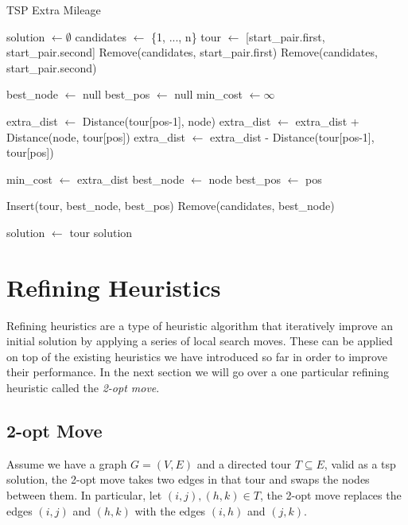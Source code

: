 \documentclass{article}
\begin{document}
\newpage

\begin{algorithm}[!ht]
\caption{TSP Extra Mileage}
\begin{algorithmic}[1]
\State solution $\gets \emptyset$
\State candidates $\gets$ \{1, ..., n\} 
\State tour $\gets$ [start\_pair.first, start\_pair.second] 
\State Remove(candidates, start\_pair.first)
\State Remove(candidates, start\_pair.second)

    \State best\_node $\gets$ null
    \State best\_pos $\gets$ null
    \State min\_cost $\gets \infty$

            \State extra\_dist $\gets$ Distance(tour[pos-1], node)
            \State extra\_dist $\gets$ extra\_dist + Distance(node, tour[pos])
            \State extra\_dist $\gets$ extra\_dist - Distance(tour[pos-1], tour[pos])
            
                \State min\_cost $\gets$ extra\_dist
                \State best\_node $\gets$ node
                \State best\_pos $\gets$ pos
            \EndIf
        \EndFor
    \EndFor

    \State Insert(tour, best\_node, best\_pos)
    \State Remove(candidates, best\_node)
\EndWhile

\State solution $\gets$ tour
\State \Return solution
\EndProcedure
\end{algorithmic}
\end{algorithm}

\newpage

\section{Refining Heuristics}
Refining heuristics are a type of heuristic algorithm that iteratively improve an initial solution by applying a series of local search moves. These can be applied on top of the existing heuristics we have 
introduced so far in order to improve their performance. In the next section we will go over a one particular refining heuristic called the \textit{2-opt move}\cite{Heuristics_for_the_Traveling_Salesman_Problem}.

\subsection{2-opt Move}
Assume we have a graph $G = (V, E)$ and a directed tour $T \subseteq E$, valid as a tsp solution, 
the 2-opt move takes two edges in that tour and swaps the nodes 
between them.  In particular, let $(i, j), (h, k) \in T$, the 2-opt move replaces the edges $(i, j)$ and $(h, k)$ with the edges $(i, h)$ and $(j, k)$. \\
\\
\end{document}
